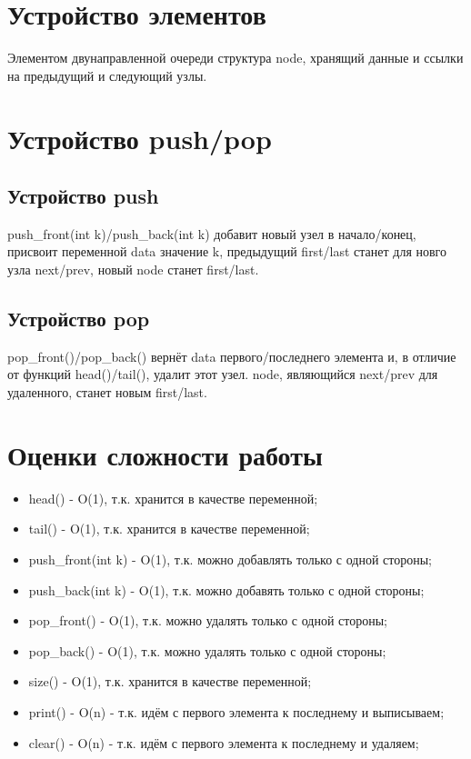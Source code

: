 \documentclass[a4paper,11pt]{report}
\begin{document}
 
\chapter{Устройство элементов}
Элементом двунаправленной очереди структура node, хранящий данные и ссылки на предыдущий и следующий узлы.
\chapter{Устройство push/pop}
\section{Устройство push}
push\_front(int k)/push\_back(int k) добавит новый узел в начало/конец, присвоит переменной data значение k, предыдущий first/last станет для новго узла next/prev, новый node станет first/last. 
\section{Устройство pop}
pop\_front()/pop\_back() вернёт data первого/последнего элемента и, в отличие от функций head()/tail(), удалит этот узел. node, являющийся next/prev для удаленного, станет новым first/last. 
\chapter{Оценки сложности работы} 
\begin{itemize}
	\item head() - O(1), т.к. хранится в качестве переменной;
	\item tail() - O(1), т.к. хранится в качестве переменной;
	\item push\_front(int k) - O(1), т.к. можно добавлять только с одной стороны;
	\item push\_back(int k) - O(1), т.к. можно добавять только с одной стороны;
	\item pop\_front() - O(1), т.к. можно удалять только с одной стороны;
	\item pop\_back() - O(1), т.к. можно удалять только с одной стороны;
	\item size() - O(1), т.к. хранится в качестве переменной;
	\item print() - O(n) - т.к. идём с первого элемента к последнему и выписываем;
	\item clear() - O(n) - т.к. идём с первого элемента к последнему и удаляем;
\end{itemize} 
\end{document}
